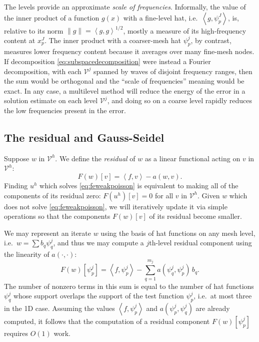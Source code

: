\documentclass[letterpaper,final,12pt,reqno]{amsart}
\theoremstyle{claim}
\newcommand{\ip}[2]{\left<#1,#2\right>}
\numberwithin{equation}{section}
\numberwithin{figure}{section}
\numberwithin{table}{section}
\begin{document}
The levels provide an approximate \emph{scale of frequencies}.  Informally, the value of the inner product of a function $g(x)$ with a fine-level hat, i.e.~$\ip{g}{\psi_p^J}$, is, relative to its norm $\|g\| = \ip{g}{g}^{1/2}$, mostly a measure of its high-frequency content at $x_p^J$.  The inner product with a coarser-mesh hat $\psi_p^j$, by contrast, measures lower frequency content because it averages over many fine-mesh nodes.  If decomposition \eqref{eq:subspacedecomposition} were instead a Fourier decomposition, with each $\mathcal{V}^j$ spanned by waves of disjoint frequency ranges, then the sum would be orthogonal and the ``scale of frequencies'' meaning would be exact.  In any case, a multilevel method will reduce the energy of the error in a solution estimate on each level $\mathcal{V}^j$, and doing so on a coarse level rapidly reduces the low frequencies present in the error.

\subsection*{The residual and Gauss-Seidel}  Suppose $w$ in $\mathcal{V}^h$.  We define the \emph{residual} of $w$ as a linear functional acting on $v$ in $\mathcal{V}^h$:
\begin{equation}
  F(w)[v] = \ip{f}{v} - a(w,v).  \label{eq:residual}
\end{equation}
Finding $u^h$ which solves \eqref{eq:feweakpoisson} is equivalent to making all of the components of its residual zero: $F(u^h)[v]=0$ for all $v$ in $\mathcal{V}^h$.  Given $w$ which does not solve \eqref{eq:feweakpoisson}, we will iteratively update it via simple operations so that the components $F(w)[v]$ of its residual become smaller.

We may represent an iterate $w$ using the basis of hat functions on any mesh level, i.e.~$w = \sum b_q \psi_q^j$, and thus we may compute a $j$th-level residual component using the linearity of $a(\cdot,\cdot)$:
\begin{equation}
  F(w)[\psi_p^j] = \ip{f}{\psi_p^j} - \sum_{q=1}^{m_j} a(\psi_q^j,\psi_p^j) \,b_q.  \label{eq:residualpoisson}
\end{equation}
The number of nonzero terms in this sum is equal to the number of hat functions $\psi_q^j$ whose support overlaps the support of the test function $\psi_p^j$, i.e.~at most three in the 1D case.  Assuming the values $\ip{f}{\psi_p^j}$ and $a(\psi_p^j,\psi_q^j)$ are already computed, it follows that the computation of a residual component $F(w)[\psi_p^j]$ requires $O(1)$ work.
\end{document}

